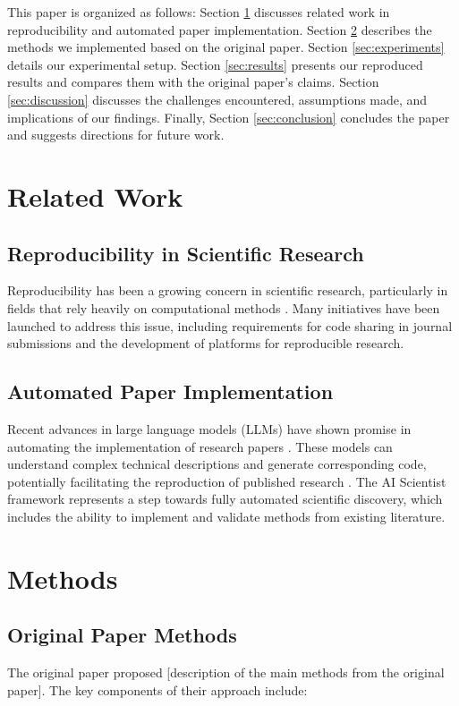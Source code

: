 \documentclass[10pt,twocolumn,letterpaper]{article}
\begin{document}
This paper is organized as follows: Section \ref{sec:related_work} discusses related work in reproducibility and automated paper implementation. Section \ref{sec:methods} describes the methods we implemented based on the original paper. Section \ref{sec:experiments} details our experimental setup. Section \ref{sec:results} presents our reproduced results and compares them with the original paper's claims. Section \ref{sec:discussion} discusses the challenges encountered, assumptions made, and implications of our findings. Finally, Section \ref{sec:conclusion} concludes the paper and suggests directions for future work.

\section{Related Work}
\label{sec:related_work}

\subsection{Reproducibility in Scientific Research}
Reproducibility has been a growing concern in scientific research, particularly in fields that rely heavily on computational methods \cite{reproducibility_crisis}. Many initiatives have been launched to address this issue, including requirements for code sharing in journal submissions and the development of platforms for reproducible research.

\subsection{Automated Paper Implementation}
Recent advances in large language models (LLMs) have shown promise in automating the implementation of research papers \cite{llm_code_generation}. These models can understand complex technical descriptions and generate corresponding code, potentially facilitating the reproduction of published research \cite{paper_to_code}. The AI Scientist framework \cite{ai_scientist} represents a step towards fully automated scientific discovery, which includes the ability to implement and validate methods from existing literature.

\section{Methods}
\label{sec:methods}

\subsection{Original Paper Methods}
The original paper \cite{original_paper} proposed [description of the main methods from the original paper]. The key components of their approach include:
\end{document}
